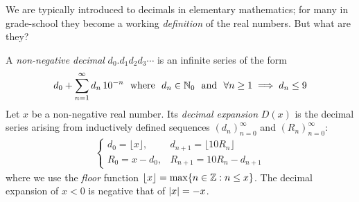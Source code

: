 \graphicspath{{notes/3series/asy/}}

\pagestyle{empty}


We are typically introduced to decimals in elementary mathematics; for many in grade-school they become a working \emph{definition} of the real numbers. But what are they?

\begin{defn*}{}{}
	A \emph{non-negative decimal} $d_0.d_1d_2d_3\cdots$ is an infinite series of the form
	\[
		d_0+\sum_{n=1}^\infty d_n\,10^{-n}
		\ \text{ where }\ d_n\in\N_0 \ \text{ and }\ 
		\forall n\ge 1\implies d_n\le 9
	\]
	Let $x$ be a non-negative real number. Its \emph{decimal expansion} $D(x)$ is the decimal series arising from inductively defined sequences $(d_n)_{n=0}^\infty$ and $(R_n)_{n=0}^\infty$:
	\begin{gather*}
		\begin{cases}
			d_0=\lfloor x\rfloor,&d_{n+1}=\lfloor 10R_n\rfloor\\
			R_0=x-d_0,&R_{n+1}=10R_n-d_{n+1}
		\end{cases}
	\end{gather*}
	where we use the \emph{floor} function $\lfloor x\rfloor =\max\{n\in\mathbb{Z}:n\le x\}$.\smallbreak
	The decimal expansion of $x<0$ is negative that of $\left| x\right|=-x$.
\end{defn*}

